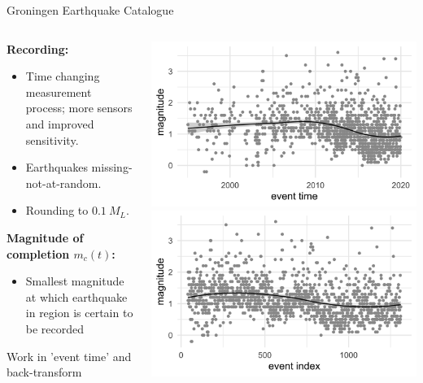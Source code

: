 \begin{frame}{Groningen Earthquake Catalogue}
  \begin{columns}
  \begin{column}{0.6\textwidth}
      \textbf{Recording:}
    \begin{itemize}
        \item Time changing measurement process; more sensors and improved sensitivity.
        \item Earthquakes missing-not-at-random.
        \item Rounding to $0.1~M_L$.
    \end{itemize}
    \vspace{2em}
   \textbf{Magnitude of completion $m_c(t)$:}
    \begin{itemize}
    \item Smallest magnitude at which earthquake in region is certain to be recorded
    \end{itemize}
    \vspace{1em}
    \small{Work in 'event time' and back-transform}
  \end{column}
  \begin{column}{0.4\textwidth}
  \includegraphics[width = \textwidth]{groningen_catalogue_natural.png}
  \\
  \vspace{2em}
  \includegraphics[width = \textwidth]{groningen_catalogue_index.png}
  \end{column}
  \end{columns}  
\end{frame}

